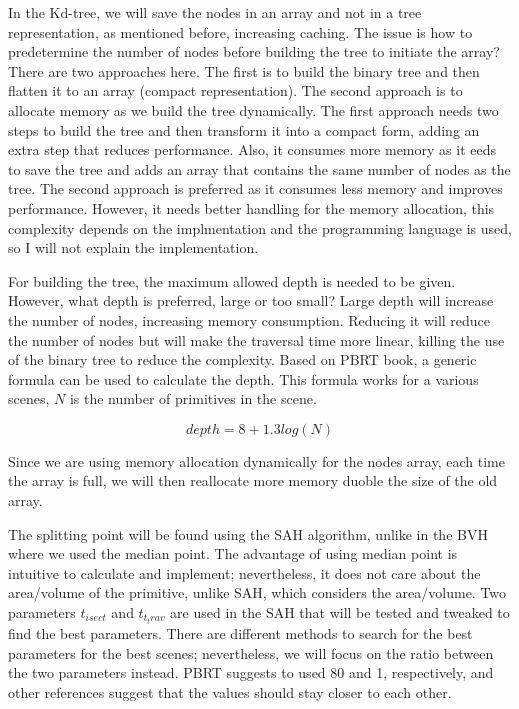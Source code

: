 \documentclass[11pt,a4paper]{article}
\begin{document}
In the Kd-tree, we will save the nodes in an array and not in a tree representation, as mentioned before, increasing caching. The issue is how to predetermine the number of nodes before building the tree to initiate the array? There are two approaches here. The first is to build the binary tree and then flatten it to an array (compact representation). The second approach is to allocate memory as we build the tree dynamically. The first approach needs two steps to build the tree and then transform it into a compact form, adding an extra step that reduces performance. Also, it consumes more memory as it eeds to save the tree and adds an array that contains the same number of nodes as the tree. The second approach is preferred as it consumes less memory and improves performance. However, it needs better handling for the memory allocation, this complexity depends on the implmentation and the programming language is used, so I will not explain the implementation. 
\\
\noindent

For building the tree, the maximum allowed depth is needed to be given. However, what depth is preferred, large or too small? Large depth will increase the number of nodes, increasing memory consumption. Reducing it will reduce the number of nodes but will make the traversal time more linear, killing the use of the binary tree to reduce the complexity. Based on  PBRT book, a generic formula can be used to calculate the depth. This formula works for a various scenes, $N$ is the number of primitives in the scene. 


\begin{equation}
depth = 8 + 1.3log(N)
\end{equation}


Since we are using memory allocation dynamically for the nodes array, each time the array is full, we will then reallocate more memory duoble the size of the old array.
\\
\noindent

The splitting point will be found using the SAH algorithm, unlike in the BVH where we used the median point. The advantage of using median point is intuitive to calculate and implement; nevertheless, it does not care about the area/volume of the primitive, unlike SAH, which considers the area/volume. Two parameters $t_{isect}$ and $t_{t_trav}$ are used in the SAH that will be tested and tweaked to find the best parameters. There are different methods to search for the best parameters for the best scenes; nevertheless, we will focus on the ratio between the two parameters instead. PBRT suggests to used 80 and 1, respectively, and other references suggest that the values should stay closer to each other. 
\\
\noindent
\end{document}
